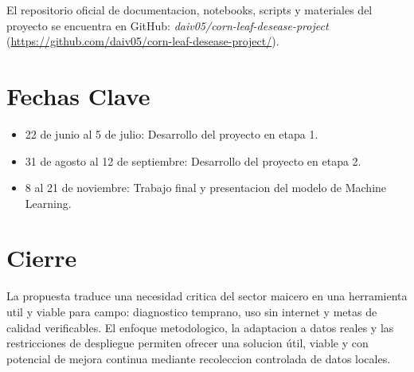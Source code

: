 \documentclass[10pt,journal,compsoc]{IEEEtran} %
\begin{document}
El repositorio oficial de documentacion, notebooks, scripts y materiales del proyecto se encuentra en GitHub: \textit{daiv05/corn-leaf-desease-project} (\url{https://github.com/daiv05/corn-leaf-desease-project/}).

\section{Fechas Clave}
\begin{itemize}
    \item 22 de junio al 5 de julio: Desarrollo del proyecto en etapa 1.
    \item 31 de agosto al 12 de septiembre: Desarrollo del proyecto en etapa 2.
    \item 8 al 21 de noviembre: Trabajo final y presentacion del modelo de Machine Learning.
\end{itemize}

\section{Cierre}
La propuesta traduce una necesidad critica del sector maicero en una herramienta util y viable para campo: diagnostico temprano, uso sin internet y metas de calidad verificables. El enfoque metodologico, la adaptacion a datos reales y las restricciones de despliegue permiten ofrecer una solucion útil, viable y con potencial de mejora continua mediante recoleccion controlada de datos locales.
\end{document}
